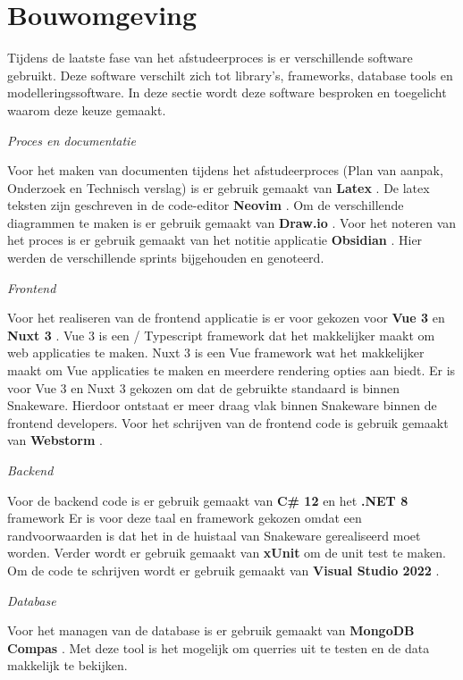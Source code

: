 \section{Bouwomgeving}
Tijdens de laatste fase van het afstudeerproces is er verschillende software gebruikt.
Deze software verschilt zich tot library's, frameworks, database tools en modelleringssoftware.
In deze sectie wordt deze software besproken en toegelicht waarom deze keuze gemaakt.

\whitespace[2]
\textit{Proces en documentatie}

\whitespace[2]
Voor het maken van documenten tijdens het afstudeerproces (Plan van aanpak, Onderzoek en Technisch verslag) is er gebruik gemaakt van \textbf{Latex} \parencite{Latex}.
De latex teksten zijn geschreven in de code-editor \textbf{Neovim} \parencite{NeoVim}.
Om de verschillende diagrammen te maken is er gebruik gemaakt van \textbf{Draw.io} \parencite{Drawio}.
Voor het noteren van het proces is er gebruik gemaakt van het notitie applicatie \textbf{Obsidian} \parencite{Obsidian}.
Hier werden de verschillende sprints bijgehouden en genoteerd.

\whitespace[2]
\textit{Frontend}

\whitespace[2]
Voor het realiseren van de frontend applicatie is er voor gekozen voor \textbf{Vue 3} \parencite{Vue} en \textbf{Nuxt 3} \parencite{Nuxt}. 
Vue 3 is een \parencite{JavaScript} / Typescript \parencite{Typescript} framework dat het makkelijker maakt om web applicaties te maken.
Nuxt 3 is een Vue framework wat het makkelijker maakt om Vue applicaties te maken en meerdere rendering opties aan biedt.
Er is voor Vue 3 en Nuxt 3 gekozen om dat de gebruikte standaard is binnen Snakeware.
Hierdoor ontstaat er meer draag vlak binnen Snakeware binnen de frontend developers.
Voor het schrijven van de frontend code is gebruik gemaakt van \textbf{Webstorm} \parencite{Webstorm}.

\whitespace[2]
\textit{Backend}

\whitespace[2]
Voor de backend code is er gebruik gemaakt van \textbf{C\# 12} \parencite{CSharp} en het \textbf{.NET 8} framework \parencite{DotNet8}
Er is voor deze taal en framework gekozen omdat een  randvoorwaarden is dat het in de huistaal van Snakeware gerealiseerd moet worden.
Verder wordt er gebruik gemaakt van \textbf{xUnit} \parencite{xUnit} om de unit test te maken.
Om de code te schrijven wordt er gebruik gemaakt van \textbf{Visual Studio 2022} \parencite{VisualStudio}.

\whitespace[2]
\textit{Database}

\whitespace[2]
Voor het managen van de database is er gebruik gemaakt van \textbf{MongoDB Compas} \parencite{MongoDBCompas}.
Met deze tool is het mogelijk om querries uit te testen en de data makkelijk te bekijken.
%
% 
% 
